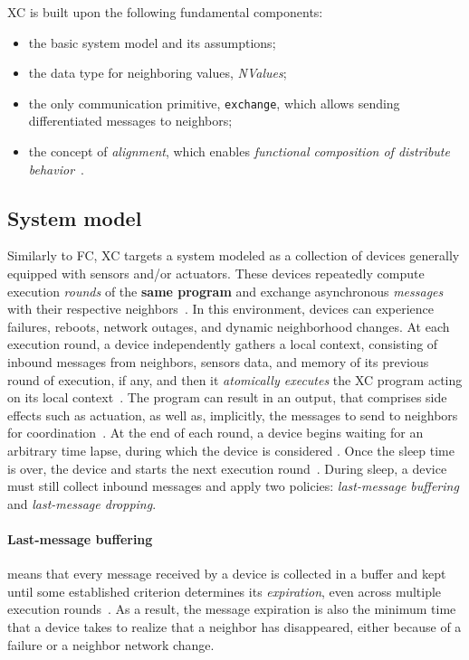 \ac{XC} is built upon the following fundamental components:
\begin{itemize}
    \item the basic system model and its assumptions;
    \item the data type for neighboring values, \textit{NValues};
    \item the only communication primitive, \texttt{exchange}, which allows sending differentiated messages to neighbors;
    \item the concept of \textit{alignment}, which enables \textit{functional composition of distribute behavior}~\cite{xc}.
\end{itemize}


\subsection{System model}

Similarly to \ac{FC}, \ac{XC} targets a system modeled as a collection of devices generally equipped with sensors and/or actuators.
%
These devices repeatedly compute execution \textit{rounds} of the \textbf{same program} and exchange asynchronous \textit{messages} with their respective neighbors~\cite{xc}.
%
In this environment, devices can experience failures, reboots, network outages, and dynamic neighborhood changes.
%
At each execution round, a device independently gathers a local context, consisting of inbound messages from neighbors, sensors data, and memory of its previous round of execution, if any, and then it \textit{atomically executes} the \ac{XC} program acting on its local context~\cite{xc}.
%
The program can result in an output, that comprises side effects such as actuation, as well as, implicitly, the messages to send to neighbors for coordination~\cite{xc}.
%
At the end of each round, a device begins waiting for an arbitrary time lapse, during which the device is considered .
%
Once the sleep time is over, the device  and starts the next execution round~\cite{xc}.
%
During sleep, a device must still collect inbound messages and apply two policies: \textit{last-message buffering} and \textit{last-message dropping}.

\paragraph{Last-message buffering} means that every message received by a device is collected in a buffer and kept until some established criterion determines its \textit{expiration}, even across multiple execution rounds~\cite{xc}.
%
As a result, the message expiration is also the minimum time that a device takes to realize that a neighbor has disappeared, either because of a failure or a neighbor network change.

